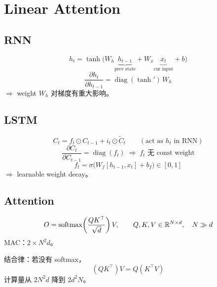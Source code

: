 \section{Linear Attention}

\subsection{RNN}

\begin{equation}
  h_t = \tanh\bigl(W_h \underbrace{h_{t-1}}_{\text{prev state}} + W_x \underbrace{x_t}_{\text{cur input}} + b\bigr)
\end{equation}
\begin{equation}
  \frac{\partial h_t}{\partial h_{t-1}} = \operatorname{diag}(\tanh')\, W_h
\end{equation}
$\Rightarrow$ weight $W_h$ 对梯度有重大影响。

\subsection{LSTM}

\begin{equation}
  C_t = f_t \odot C_{t-1} + i_t \odot \tilde{C}_t
  \qquad (\text{act as } h_t \text{ in RNN})
\end{equation}
\begin{equation}
  \frac{\partial C_t}{\partial C_{t-1}} = \operatorname{diag}(f_t)
  \;\Rightarrow\; f_t \text{ 无 const weight}
\end{equation}
\begin{equation}
  f_t = \sigma\bigl(W_f [h_{t-1}, x_t] + b_f\bigr) \in [0, 1]
\end{equation}
$\Rightarrow$ learnable weight decay。

\subsection{Attention}

\begin{equation}
  O = \operatorname{softmax}\!\left(\frac{QK^\top}{\sqrt{d}}\right) V,
  \qquad Q, K, V \in \mathbb{R}^{N \times d}, \quad N \gg d
\end{equation}
MAC：$2 \times N^2 d$。

结合律：若没有 softmax，
\begin{equation}
  (QK^\top) V = Q (K^\top V)
\end{equation}
计算量从 $2N^2 d$ 降到 $2d^2 N$。

